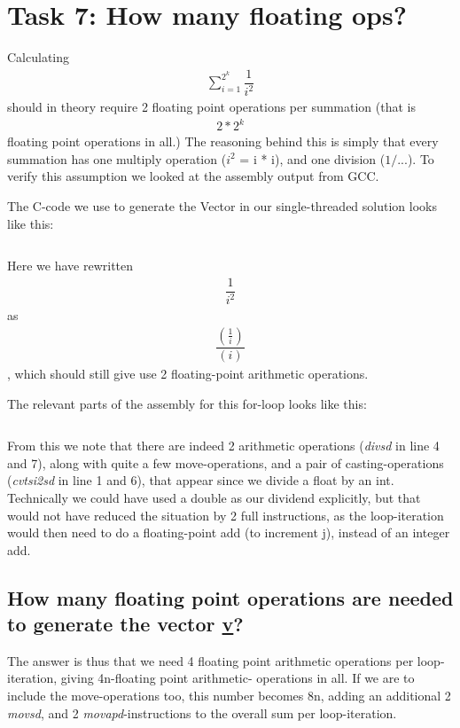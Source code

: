 \section{Task 7: How many floating ops?}

Calculating \begin{align*}\sum_{i=1}^{2^k}\dfrac{1}{i^2}\end{align*} should in theory require 2 floating
point operations per summation (that is \begin{align*}2*2^k\end{align*} floating point operations in all.)
The reasoning behind this is simply that every summation has one multiply operation ($i^2$ = i * i), and one division
($1/...$). To verify this assumption we looked at the assembly output from GCC.

The C-code we use to generate the Vector in our single-threaded solution
looks like this:
\inputminted[tabsize=4]{c}{CreateVector.c}

Here we have rewritten \begin{align*}\dfrac{1}{i^2}\end{align*} as \begin{align*}\dfrac{\left(\frac{1}{i}\right)}{(i)}\end{align*}, which
should still give use 2 floating-point arithmetic operations.

The relevant parts of the assembly for this for-loop looks like this:

\inputminted[linenos]{gas}{SingleThread.s}

From this we note that there are indeed 2 arithmetic operations (\textit{divsd} in line 4 and 7), along with quite a few move-operations,
and a pair of casting-operations (\textit{cvtsi2sd} in line 1 and 6), that appear since we divide a float by an int. Technically we could
have used a double as our dividend explicitly, but that would not have reduced the situation by 2 full instructions,
as the loop-iteration would then need to do a floating-point add (to increment j), instead of an integer add.

\subsection{How many floating point operations are needed to generate the vector \underline{v}?}
The answer is thus that we need 4 floating point arithmetic operations per loop-iteration, giving 4n-floating point arithmetic-
operations in all. If we are to include the move-operations too, this number becomes 8n, adding an additional 2 \textit{movsd},
and 2 \textit{movapd}-instructions to the overall sum per loop-iteration.

